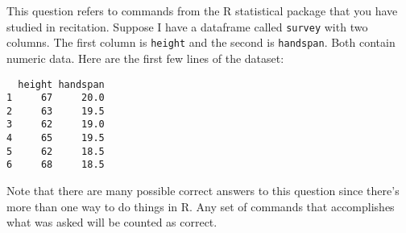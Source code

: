 \documentclass[addpoints,12pt]{exam}
\begin{document}
\begin{questions}

\question This question refers to commands from the R statistical package that you have studied in recitation. Suppose I have a dataframe called \texttt{survey} with two columns. The first column is \texttt{height} and the second is \texttt{handspan}. Both contain numeric data. Here are the first few lines of the dataset:
	\begin{verbatim}
  height handspan
1     67     20.0
2     63     19.5
3     62     19.0
4     65     19.5
5     62     18.5
6     68     18.5
	\end{verbatim}
	\begin{solution}
	Note that there are many possible correct answers to this question since there's more than one way to do things in R. Any set of commands that accomplishes what was asked will be counted as correct. 
	\end{solution}
\end{questions}
\end{document}
